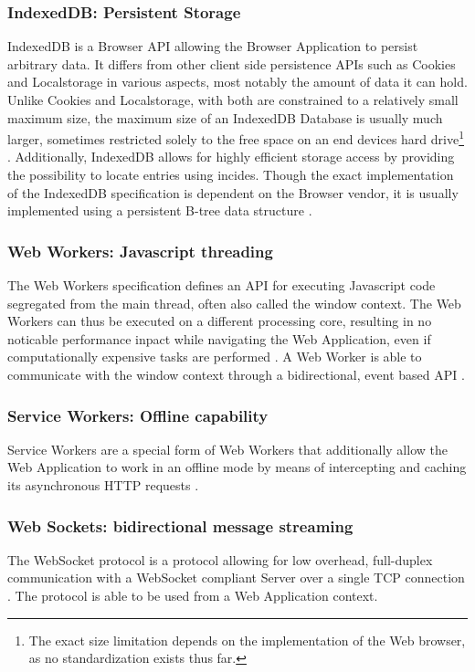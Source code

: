 \subsubsection{IndexedDB: Persistent Storage}
IndexedDB is a Browser API allowing the Browser Application to persist arbitrary data. It differs from other client side persistence APIs such as Cookies and Localstorage in various aspects, most notably the amount of data it can hold. Unlike Cookies and Localstorage, with both are constrained to a relatively small maximum size, the maximum size of an IndexedDB Database is usually much larger, sometimes restricted solely to the free space on an end devices hard drive\footnote{The exact size limitation depends on the implementation of the Web browser, as no standardization exists thus far.} \cite{MDNIndexedDB}. Additionally, IndexedDB allows for highly efficient storage access by providing the possibility to locate entries using incides. Though the exact implementation of the IndexedDB specification is dependent on the Browser vendor, it is usually implemented using a persistent B-tree data structure \cite[sec. 1]{IndexedDBSpec}.
\subsubsection{Web Workers: Javascript threading}
The Web Workers specification defines an API for executing Javascript code segregated from the main thread, often also called the window context. The Web Workers can thus be executed on a different processing core, resulting in no noticable performance inpact while navigating the Web Application, even if computationally expensive tasks are performed \cite[sec. 1.2.1]{workerdraft}. A Web Worker is able to communicate with the window context through a bidirectional, event based API \cite[sec. 4.6.1]{workerdraft}.
\subsubsection{Service Workers: Offline capability}
Service Workers are a special form of Web Workers that additionally allow the Web Application to work in an offline mode by means of intercepting and caching its asynchronous HTTP requests \cite[sec 4.5, 5]{serviceworkersdraft}.
\subsubsection{Web Sockets: bidirectional message streaming}
The WebSocket protocol is a protocol allowing for low overhead, full-duplex communication with a WebSocket compliant Server over a single TCP connection \cite[sec. 1.1]{rfc6455}. The protocol is able to be used from a Web Application context.
\label{sec:tech-web-sockets}

